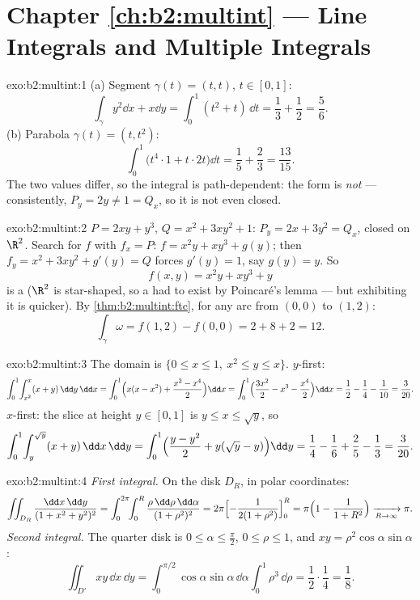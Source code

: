 \section*{Chapter \ref{ch:b2:multint} --- Line Integrals and Multiple Integrals}

\begin{solution}{exo:b2:multint:1}
(a) Segment $\gamma(t) = (t, t)$, $t \in [0,1]$:
\[
\int_\gamma y^2\dd x + x\dd y
= \int_0^1 (t^2 + t)\,\dd t = \frac13 + \frac12 = \frac56 .
\]
(b) Parabola $\gamma(t) = (t, t^2)$:
\[
\int_0^1 \bigl(t^4\cdot 1 + t\cdot 2t\bigr)\dd t
= \frac15 + \frac23 = \frac{13}{15} .
\]
The two values differ, so the integral is path-dependent: the form
is \emph{not}  --- consistently, $P_y = 2y \neq 1 = Q_x$, so
it is not even closed.
\end{solution}

\begin{solution}{exo:b2:multint:2}
$P = 2xy + y^3$, $Q = x^2 + 3xy^2 + 1$: $P_y = 2x + 3y^2 = Q_x$,
closed on $\R^2$. Search for $f$ with $f_x = P$: $f = x^2y + xy^3
+ g(y)$; then $f_y = x^2 + 3xy^2 + g'(y) = Q$ forces $g'(y) = 1$,
say $g(y) = y$. So
\[
f(x, y) = x^2y + xy^3 + y
\]
is a  ($\R^2$ is star-shaped, so a  had to
exist by Poincaré's lemma --- but exhibiting it is quicker). By
\cref{thm:b2:multint:ftc}, for any arc from $(0,0)$ to $(1,2)$:
\[
\int_\gamma\omega = f(1, 2) - f(0, 0) = 2 + 8 + 2 = 12 .
\]
\end{solution}

\begin{solution}{exo:b2:multint:3}
The domain is $\{0 \leq x \leq 1,\ x^2 \leq y \leq x\}$.
$y$-first:
\[
\int_0^1\!\int_{x^2}^{x}(x + y)\,\dd y\,\dd x
= \int_0^1\Bigl(x(x - x^2)
+ \frac{x^2 - x^4}{2}\Bigr)\dd x
= \int_0^1\Bigl(\frac{3x^2}{2} - x^3 - \frac{x^4}{2}\Bigr)\dd x
= \frac12 - \frac14 - \frac1{10} = \frac{3}{20} .
\]
$x$-first: the slice at height $y \in [0, 1]$ is $y \leq x \leq
\sqrt y$, so
\[
\int_0^1\!\int_{y}^{\sqrt y}(x + y)\,\dd x\,\dd y
= \int_0^1\Bigl(\frac{y - y^2}{2}
+ y(\sqrt y - y)\Bigr)\dd y
= \frac14 - \frac16 + \frac25 - \frac13 = \frac{3}{20} .
\]
\end{solution}

\begin{solution}{exo:b2:multint:4}
\emph{First integral.} On the disk $D_R$, in polar coordinates:
\[
\iint_{D_R}\frac{\dd x\,\dd y}{(1 + x^2 + y^2)^2}
= \int_0^{2\pi}\!\!\int_0^R
\frac{\rho\,\dd\rho\,\dd\alpha}{(1 + \rho^2)^2}
= 2\pi\Bigl[-\frac{1}{2(1 + \rho^2)}\Bigr]_0^R
= \pi\Bigl(1 - \frac{1}{1 + R^2}\Bigr)
\xrightarrow[R \to \infty]{} \pi .
\]
\emph{Second integral.} The quarter disk is $0 \leq \alpha \leq
\frac\pi2$, $0 \leq \rho \leq 1$, and $xy =
\rho^2\cos\alpha\sin\alpha$:
\[
\iint_{D'}xy\,\dd x\,\dd y
= \int_0^{\pi/2}\!\!\cos\alpha\sin\alpha\,\dd\alpha
\int_0^1 \rho^3\,\dd\rho
= \frac12\cdot\frac14 = \frac18 .
\]
\end{solution}

